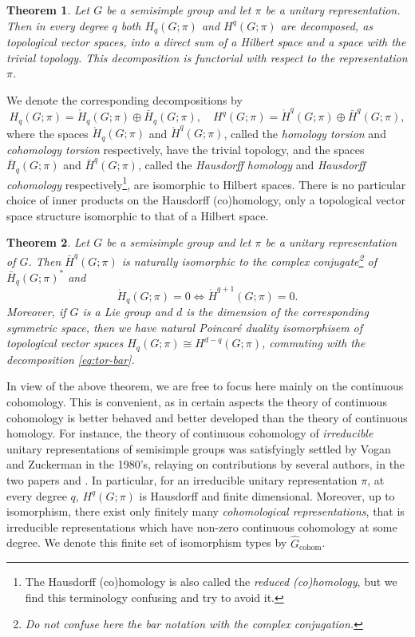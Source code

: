 \documentclass[12pt,reqno]{amsart}
\newtheorem{mainthm}{Theorem}
\theoremstyle{definition}
\newcommand{\torH}{\mathring{H}}
\newcommand{\barH}{\bar{H}}
\begin{document}
\begin{mainthm}\label{intro:torsion-reduced}
Let $G$ be a semisimple group and let $\pi$ be a unitary representation.
Then in every degree $q$ both $H_q(G;\pi)$ and $H^q(G;\pi)$ are decomposed, as topological vector spaces, into a direct sum of a Hilbert space and a space with the trivial topology. This decomposition is functorial with respect to the representation $\pi$.
\end{mainthm}

We denote the corresponding decompositions by 
\begin{equation} \label{eq:tor-bar}
   H_q(G;\pi)= \torH_q(G;\pi)\oplus \barH_q(G;\pi), \quad H^q(G;\pi)= \torH^q(G;\pi)\oplus \barH^q(G;\pi), 
\end{equation}
where the spaces $\torH_q(G;\pi)$ and $\torH^q(G;\pi)$, called the \emph{homology torsion} and \emph{cohomology torsion} respectively, have the trivial topology, and the spaces $\barH_q(G;\pi)$ and $\barH^q(G;\pi)$, called the \emph{Hausdorff homology} and \emph{Hausdorff cohomology} respectively\footnote{The Hausdorff (co)homology is also called the \emph{reduced (co)homology}, but we find this terminology confusing and try to avoid it.}, are isomorphic to Hilbert spaces.
There is no particular choice of inner products on the Hausdorff (co)homology, only a topological vector space structure isomorphic to that of a Hilbert space.

\begin{mainthm}\label{intro:homology-cohomology}
Let $G$ be a semisimple group and let $\pi$ be a unitary representation of $G$.
Then $\bar{H}^q(G;\pi)$ is naturally isomorphic to the complex conjugate\footnote{Do not confuse here the bar notation with the complex conjugation.} of $\bar{H}_q(G;\pi)^*$ and  
\[
    \torH_q(G;\pi)=0 \iff \torH^{q+1}(G;\pi)=0.
\]
    Moreover, if $G$ is a Lie group and $d$ is the dimension of the corresponding symmetric space, then we have natural Poincar\'e duality isomorphisem of topological vector spaces
    $H_q(G;\pi)\cong H^{d-q}(G;\pi)$, commuting with the decomposition \eqref{eq:tor-bar}.
\end{mainthm}

In view of the above theorem, we are free to focus here mainly on the continuous cohomology.
This is convenient, as in certain aspects the theory of continuous cohomology is better behaved and better developed than the theory of continuous homology.
For instance, the theory of continuous cohomology of
\emph{irreducible} unitary representations of semisimple groups was satisfyingly settled by Vogan and Zuckerman in the 1980's, relaying on contributions by several authors, in the two papers \cite{VZ} and \cite{Unitarizability}.
In particular, for an irreducible unitary representation $\pi$, at every degree $q$, $H^q(G;\pi)$ is Hausdorff and finite dimensional. 
Moreover, up to isomorphism, there exist only finitely many \emph{cohomological representations}, that is irreducible representations which have non-zero continuous cohomology at some degree.
We denote this finite set of isomorphism types by $\widehat{G}_{\mathrm{cohom}}$.
\end{document}

